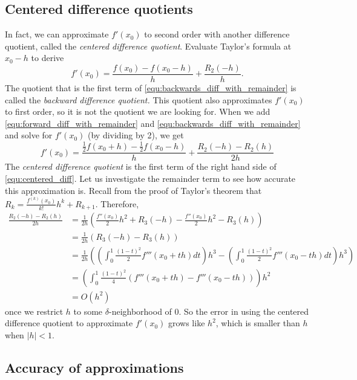\subsection*{Centered difference quotients}
In fact, we can approximate $f'(x_0)$ to second order with another difference quotient, called the \emph{centered difference quotient}. 
Evaluate Taylor's formula at $x_0-h$ to derive
\begin{equation}\label{equ:backwards_diff_with_remainder}
f'(x_0) = \frac{f(x_0)-f(x_0-h)}{h} + \frac{R_2(-h)}{h}.
\end{equation}
The quotient that is the first term of \eqref{equ:backwards_diff_with_remainder} is called the \emph{backward difference quotient.} 
This quotient also approximates $f'(x_0)$ to first order, so it is not the quotient we are looking for. 
When we add \eqref{equ:forward_diff_with_remainder} and \eqref{equ:backwards_diff_with_remainder} and solve for $f'(x_0)$ (by dividing by 2), we get
\begin{equation}\label{equ:centered_diff}
f'(x_0) = \frac{\frac{1}{2}f(x_0+h) - \frac{1}{2}f(x_0-h)}{h} + \frac{R_2(-h) - R_2(h)}{2h}
\end{equation}
The \emph{centered difference quotient} is the first term of the right hand side of \eqref{equ:centered_diff}. Let us investigate the remainder term to see how accurate this approximation is. Recall from the proof of Taylor's theorem that $R_k = \frac{f^{(k)}(x_0)}{k!}h^k + R_{k+1}$. Therefore,
\begin{align*}
\frac{R_2(-h) - R_2(h)}{2h} &= \frac{1}{2h}\left(\frac{f''(x_0)}{2}h^2 + R_{3}(-h) - \frac{f''(x_0)}{2}h^2 - R_{3}(h) \right)\\
&= \frac{1}{2h} ( R_3(-h)-R_3(h))\\
&= \frac{1}{2h}\left(  \left( \int_0^1 \frac{(1-t)^2}{2} f'''(x_0+th) dt \right) h^3  -  \left(\int_0^1 \frac{(1-t)^2}{2} f'''(x_0-th) dt \right) h^3  \right)\\
&= \left(  \int_0^1 \frac{(1-t)^2}{4}( f'''(x_0+th)-f'''(x_0-th)) \right)h^2\\
&=  O(h^2)
\end{align*}
once we restrict $h$ to some $\delta$-neighborhood of 0. 
So the error in using the centered difference quotient to approximate $f'(x_0)$ grows like $h^2$, which is smaller than $h$ when $|h|<1$.

\subsection*{Accuracy of approximations}

